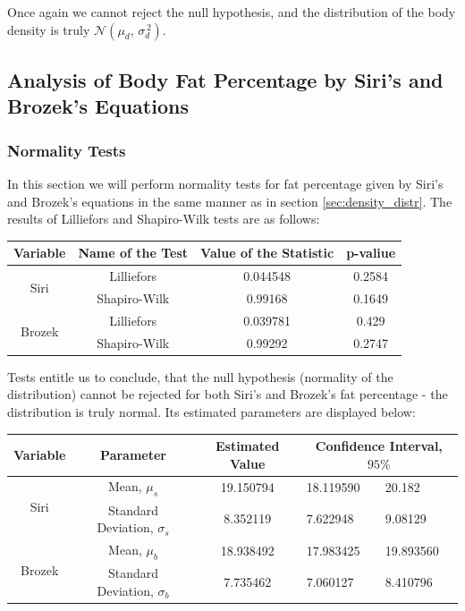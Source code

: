 \documentclass[11pt,american,american]{article}
\begin{document}
Once again we cannot reject the null hypothesis, and the distribution of the body density is truly $\mathcal{N} (\mu_{d},\,\sigma^{\,2}_{d})$.

\subsection{Analysis of Body Fat Percentage by Siri's and Brozek's Equations}

\subsubsection{Normality Tests}

In this section we will perform normality tests for fat percentage given by Siri's and Brozek's equations in the same manner as in section \ref{sec:density_distr}. The results of Lilliefors and Shapiro-Wilk tests are as follows:

\begin{table}[ht!]
	\centering
	\begin{tabular}{|c||c||c|c|}
		\hline 
		Variable & Name of the Test & Value of the Statistic & p-valiue \\ 
		\hline \hline
		\multirow{2}{*}{Siri} & Lilliefors & 0.044548 & 0.2584 \\ 
		\cline{2-4} 
		 & Shapiro-Wilk & 0.99168 & 0.1649 \\ 
		\hline \hline
		\multirow{2}{*}{Brozek} & Lilliefors & 0.039781 & 0.429 \\ 
		\cline{2-4} 
		& Shapiro-Wilk & 0.99292 & 0.2747 \\ 
		\hline
	\end{tabular} 
\end{table}

Tests entitle us to conclude, that the null hypothesis (normality of the distribution) cannot be rejected for both Siri's and Brozek's fat percentage - the distribution is truly normal. Its estimated parameters are displayed below:

\begin{table}[ht!]
	\centering
	\begin{tabular}{|c||c||c||p{2cm}|p{2cm}|}
		\hline 
		Variable & Parameter &  Estimated Value & \multicolumn{2}{c|}{Confidence Interval, $95\%$}  \\ 
		\hline \hline 
		\multirow{2}{*}{Siri} & Mean, $\mu_{s}$ & 19.150794 & 18.119590 &  20.182 \\ 
		\cline{2-5}
		& Standard Deviation, $\sigma_{s}$ & 8.352119 & 7.622948 &  9.08129 \\ 
		\hline \hline
		\multirow{2}{*}{Brozek} & Mean, $\mu_{b}$ & 18.938492 & 17.983425 &  19.893560 \\ 
		\cline{2-5}
		& Standard Deviation, $\sigma_{b}$ & 7.735462 & 7.060127 &  8.410796 \\ 
		\hline
	\end{tabular} 
\end{table}
\end{document}
